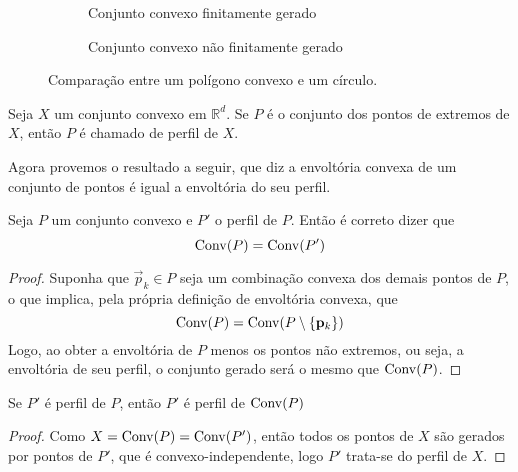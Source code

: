 \begin{figure}[h]
\centering
\begin{subfigure}{0.45\textwidth}
	\centering
	\caption{Conjunto convexo finitamente gerado}
	\label{fig:poligono}
\end{subfigure}
\hfill
\begin{subfigure}{0.50\textwidth}
	\centering
	\caption{Conjunto convexo não finitamente gerado}
	\label{fig:circulo}
\end{subfigure}
\caption{Comparação entre um polígono convexo e um círculo.}
\end{figure}

\begin{def:perfil}
  Seja $X$ um conjunto convexo em $\mathbb{R}^d$. Se $P$ é o conjunto
  dos pontos de extremos de $X$, então $P$ é chamado de perfil de $X$.
\end{def:perfil}

Agora provemos o resultado a seguir, que diz a envoltória convexa de um
conjunto de pontos é igual a envoltória do seu perfil.

\begin{prop:redundancia}
    \label{prop:redundancia}
	Seja $P$ um conjunto convexo e
	$P'$ o perfil de $P$. Então é correto dizer que
	\begin{equation*}
		\mathrm{Conv}(P) = \mathrm{Conv}(P')
	\end{equation*}
	\begin{proof}
	  Suponha que $\vec p_k \in P$ seja
	  um combinação convexa dos demais pontos de $P$, o que implica,
	  pela própria definição de envoltória convexa, que
	  \[
	  	\mathrm{Conv}(P) = \mathrm{Conv}(P \setminus \{\mathbf p_k\})
	  \]
	  Logo, ao obter a envoltória de $P$ menos os pontos não extremos,
	  ou seja, a envoltória de seu perfil, o conjunto gerado será o
	  mesmo que $\mathrm{Conv}(P)$.
	\end{proof}
\end{prop:redundancia}

\begin{cor:redundancia}
  Se $P'$ é perfil de $P$, então $P'$ é perfil de $\mathrm{Conv}(P)$
  \begin{proof}
	Como $X = \mathrm{Conv}(P) = \mathrm{Conv}(P')$, então todos os pontos de $X$ são gerados
	por pontos de $P'$, que é convexo-independente, logo $P'$ trata-se do
	perfil de $X$.
  \end{proof}

\end{cor:redundancia}

